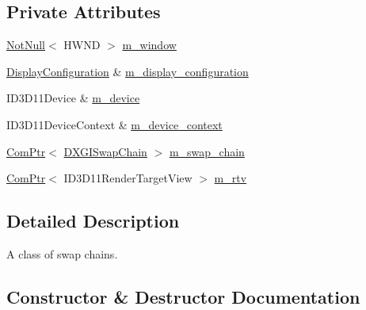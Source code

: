 \subsection*{Private Attributes}
\begin{DoxyCompactItemize}
\item 
\hyperlink{namespacemage_a8769f9d670d6b585ea306cb1062af94b}{Not\+Null}$<$ H\+W\+ND $>$ \hyperlink{classmage_1_1rendering_1_1_swap_chain_1_1_impl_a56b2c79926ed4c86de9b0cd45e0cdabd}{m\+\_\+window}
\item 
\hyperlink{classmage_1_1rendering_1_1_display_configuration}{Display\+Configuration} \& \hyperlink{classmage_1_1rendering_1_1_swap_chain_1_1_impl_a8acbe60edb384725707d9b393790293f}{m\+\_\+display\+\_\+configuration}
\item 
I\+D3\+D11\+Device \& \hyperlink{classmage_1_1rendering_1_1_swap_chain_1_1_impl_a6eff2673925babbd6dd9226dd07bf941}{m\+\_\+device}
\item 
I\+D3\+D11\+Device\+Context \& \hyperlink{classmage_1_1rendering_1_1_swap_chain_1_1_impl_aead0bec9edcee29c39a264dc9ea43780}{m\+\_\+device\+\_\+context}
\item 
\hyperlink{namespacemage_ae74f374780900893caa5555d1031fd79}{Com\+Ptr}$<$ \hyperlink{namespacemage_1_1rendering_a739d2b0d24b44bcfb16903df756fedf6}{D\+X\+G\+I\+Swap\+Chain} $>$ \hyperlink{classmage_1_1rendering_1_1_swap_chain_1_1_impl_aced5e9cea58432f63e62f133def982c9}{m\+\_\+swap\+\_\+chain}
\item 
\hyperlink{namespacemage_ae74f374780900893caa5555d1031fd79}{Com\+Ptr}$<$ I\+D3\+D11\+Render\+Target\+View $>$ \hyperlink{classmage_1_1rendering_1_1_swap_chain_1_1_impl_a7ee01074ddbc2665e8b06f61a5eb3528}{m\+\_\+rtv}
\end{DoxyCompactItemize}


\subsection{Detailed Description}
A class of swap chains. 

\subsection{Constructor \& Destructor Documentation}
\hypertarget{classmage_1_1rendering_1_1_swap_chain_1_1_impl_a9631b95d63626a41575ca18aa6dec206}{}\label{classmage_1_1rendering_1_1_swap_chain_1_1_impl_a9631b95d63626a41575ca18aa6dec206} 
